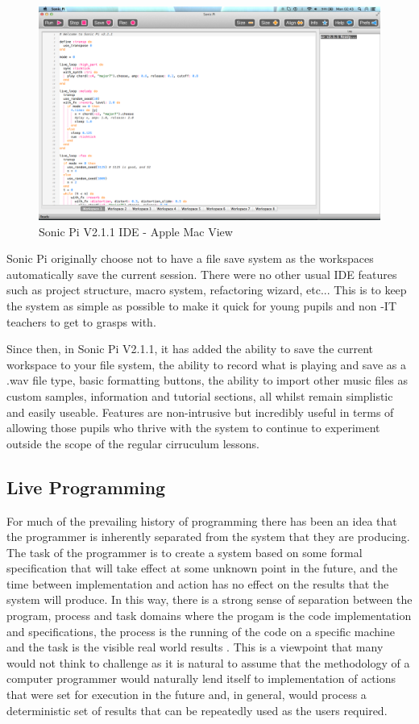 \documentclass[11pt, abstracton, twoside, titlepage=true]{scrartcl}
\begin{document}
\begin{figure}[t]
	\centering
	\includegraphics[width=\textwidth]{images/sonic-ide.png}
	\caption{Sonic Pi V2.1.1 IDE - Apple Mac View} \label{macview}
\end{figure}

Sonic Pi originally choose not to have a file save system as the workspaces 
automatically save the current session. There were no other usual IDE features 
such as project structure, macro system, refactoring wizard, etc... This is to 
keep the system as simple as possible to make it quick for young pupils and non
-IT teachers to get to grasps with.

Since then, in Sonic Pi V2.1.1, it has added the ability to save the current 
workspace to your file system, the ability to record what is playing and save 
as a .wav file type, basic formatting buttons, the ability to import other 
music files as custom samples, information and tutorial sections, all whilst 
remain simplistic and easily useable. Features are non-intrusive but 
incredibly useful in terms of allowing those pupils who thrive with the system 
to continue to experiment outside the scope of the regular cirruculum lessons.

\subsection{Live Programming}
For much of the prevailing history of programming there has been an idea that 
the programmer is inherently separated from the system that they are 
producing. The task of the programmer is to create a system based on some 
formal specification that will take effect at some unknown point in the 
future, and the time between implementation and action has no effect on the 
results that the system will produce. In this way, there is a strong sense of 
separation between the program, process and task domains where the progam is 
the code implementation and specifications, the process is the running of the 
code on a specific machine and the task is the visible real world results
\cite{SG10}. This is a viewpoint that many would not think to challenge as it 
is natural to assume that the methodology of a computer programmer would 
naturally lend itself to implementation of actions that were set for execution 
in the future and, in general, would process a deterministic set of results 
that can be repeatedly used as the users required.
\end{document}
